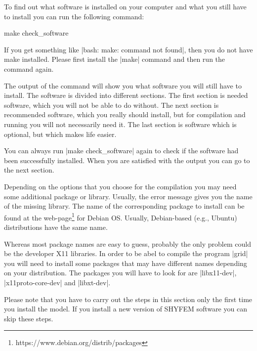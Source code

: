 To find out what software is installed on your computer and what you
still have to install you can run the following command:

\begin{code}
    make check_software
\end{code}

If you get something like |bash: make: command not found|, then you do
not have make installed. Please first install the |make| command and
then run the command again.

The output of the command will show you what software you will still have
to install. The software is divided into different sections. The first
section is needed software, which you will not be able to do without. The
next section is recommended software, which you really should install,
but for compilation and running you will not necessarily need it. The
last section is software which is optional, but which makes life easier.

You can always run |make check_software| again to check if the software
had been successfully installed. When you are satisfied with the output
you can go to the next section.

Depending on the options that you choose for the compilation you may
need some additional package or library. Usually, the error message
gives you the name of the missing library. The name of the corresponding
package to install can be found at the 
web-page\footnote{https://www.debian.org/distrib/packages} for Debian OS.
Usually, Debian-based (e.g., Ubuntu) distributions have the same name.

Whereas most package names are easy to guess, probably the only problem 
could be the developer X11 libraries. In order to be abel to compile the
program |grid| you will need to install some packages that may have
different names depending on your distribution. The packages you will
have to look for are |libx11-dev|, |x11proto-core-dev| and |libxt-dev|.

Please note that you have to carry out the steps in this section only
the first time you install the model. If you install a new version of
SHYFEM software you can skip these steps.

